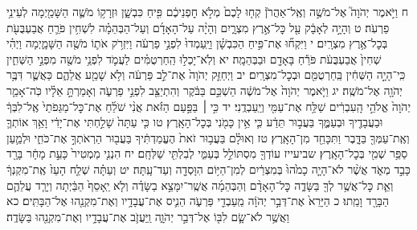 \documentclass[twoside, openany, parskip=half, 11pt]{book}
\begin{document}
ח וַיֹּ֣אמֶר יְהֹוָה֮ אֶל־מֹשֶׁ֣ה וְאֶֽל־אַהֲרֹן֒ קְח֤וּ לָכֶם֙ מְלֹ֣א חׇפְנֵיכֶ֔ם פִּ֖יחַ כִּבְשָׁ֑ן וּזְרָק֥וֹ מֹשֶׁ֛ה הַשָּׁמַ֖יְמָה לְעֵינֵ֥י פַרְעֹֽה׃ ט וְהָיָ֣ה לְאָבָ֔ק עַ֖ל כׇּל־אֶ֣רֶץ מִצְרָ֑יִם וְהָיָ֨ה עַל־הָאָדָ֜ם וְעַל־הַבְּהֵמָ֗ה לִשְׁחִ֥ין פֹּרֵ֛חַ אֲבַעְבֻּעֹ֖ת בְּכׇל־אֶ֥רֶץ מִצְרָֽיִם׃ י וַיִּקְח֞וּ אֶת־פִּ֣יחַ הַכִּבְשָׁ֗ן וַיַּֽעַמְדוּ֙ לִפְנֵ֣י פַרְעֹ֔ה וַיִּזְרֹ֥ק אֹת֛וֹ מֹשֶׁ֖ה הַשָּׁמָ֑יְמָה וַיְהִ֗י שְׁחִין֙ אֲבַעְבֻּעֹ֔ת פֹּרֵ֕חַ בָּאָדָ֖ם וּבַבְּהֵמָֽה׃ יא וְלֹֽא־יָכְל֣וּ הַֽחַרְטֻמִּ֗ים לַעֲמֹ֛ד לִפְנֵ֥י מֹשֶׁ֖ה מִפְּנֵ֣י הַשְּׁחִ֑ין כִּֽי־הָיָ֣ה הַשְּׁחִ֔ין בַּֽחַרְטֻמִּ֖ם וּבְכׇל־מִצְרָֽיִם׃ יב וַיְחַזֵּ֤ק יְהֹוָה֙ אֶת־לֵ֣ב פַּרְעֹ֔ה וְלֹ֥א שָׁמַ֖ע אֲלֵהֶ֑ם כַּאֲשֶׁ֛ר דִּבֶּ֥ר יְהֹוָ֖ה אֶל־מֹשֶֽׁה׃
יג וַיֹּ֤אמֶר יְהֹוָה֙ אֶל־מֹשֶׁ֔ה הַשְׁכֵּ֣ם בַּבֹּ֔קֶר וְהִתְיַצֵּ֖ב לִפְנֵ֣י פַרְעֹ֑ה וְאָמַרְתָּ֣ אֵלָ֗יו כֹּֽה־אָמַ֤ר יְהֹוָה֙ אֱלֹהֵ֣י הָֽעִבְרִ֔ים שַׁלַּ֥ח אֶת־עַמִּ֖י וְיַֽעַבְדֻֽנִי׃ יד כִּ֣י ׀ בַּפַּ֣עַם הַזֹּ֗את אֲנִ֨י שֹׁלֵ֜חַ אֶת־כׇּל־מַגֵּפֹתַי֙ אֶֽל־לִבְּךָ֔ וּבַעֲבָדֶ֖יךָ וּבְעַמֶּ֑ךָ בַּעֲב֣וּר תֵּדַ֔ע כִּ֛י אֵ֥ין כָּמֹ֖נִי בְּכׇל־הָאָֽרֶץ׃ טו כִּ֤י עַתָּה֙ שָׁלַ֣חְתִּי אֶת־יָדִ֔י וָאַ֥ךְ אוֹתְךָ֛ וְאֶֽת־עַמְּךָ֖ בַּדָּ֑בֶר וַתִּכָּחֵ֖ד מִן־הָאָֽרֶץ׃ טז וְאוּלָ֗ם בַּעֲב֥וּר זֹאת֙ הֶעֱמַדְתִּ֔יךָ בַּעֲב֖וּר הַרְאֹתְךָ֣ אֶת־כֹּחִ֑י וּלְמַ֛עַן סַפֵּ֥ר שְׁמִ֖י בְּכׇל־הָאָֽרֶץ׃ שביעייז עוֹדְךָ֖ מִסְתּוֹלֵ֣ל בְּעַמִּ֑י לְבִלְתִּ֖י שַׁלְּחָֽם׃ יח הִנְנִ֤י מַמְטִיר֙ כָּעֵ֣ת מָחָ֔ר בָּרָ֖ד כָּבֵ֣ד מְאֹ֑ד אֲשֶׁ֨ר לֹא־הָיָ֤ה כָמֹ֙הוּ֙ בְּמִצְרַ֔יִם לְמִן־הַיּ֥וֹם הִוָּסְדָ֖ה וְעַד־עָֽתָּה׃ יט וְעַתָּ֗ה שְׁלַ֤ח הָעֵז֙ אֶֽת־מִקְנְךָ֔ וְאֵ֛ת כׇּל־אֲשֶׁ֥ר לְךָ֖ בַּשָּׂדֶ֑ה כׇּל־הָאָדָ֨ם וְהַבְּהֵמָ֜ה אֲשֶֽׁר־יִמָּצֵ֣א בַשָּׂדֶ֗ה וְלֹ֤א יֵֽאָסֵף֙ הַבַּ֔יְתָה וְיָרַ֧ד עֲלֵהֶ֛ם הַבָּרָ֖ד וָמֵֽתוּ׃ כ הַיָּרֵא֙ אֶת־דְּבַ֣ר יְהֹוָ֔ה מֵֽעַבְדֵ֖י פַּרְעֹ֑ה הֵנִ֛יס אֶת־עֲבָדָ֥יו וְאֶת־מִקְנֵ֖הוּ אֶל־הַבָּתִּֽים׃ כא וַאֲשֶׁ֥ר לֹא־שָׂ֛ם לִבּ֖וֹ אֶל־דְּבַ֣ר יְהֹוָ֑ה וַֽיַּעֲזֹ֛ב אֶת־עֲבָדָ֥יו וְאֶת־מִקְנֵ֖הוּ בַּשָּׂדֶֽה׃
\end{document}
